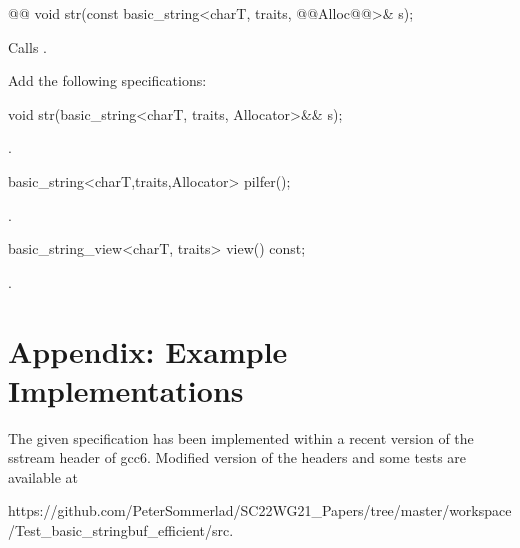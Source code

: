 \documentclass[ebook,11pt,article]{memoir}
\begin{document}
\begin{itemdecl}
    @@
    void str(const basic_string<charT, traits, @@Alloc@@>& s);
\end{itemdecl}

\begin{itemdescr}
\pnum
\effects
Calls
.
\end{itemdescr}


Add the following specifications:

\begin{addedblock}
\begin{itemdecl}
void str(basic_string<charT, traits, Allocator>&& s);
\end{itemdecl}
\begin{itemdescr}
\pnum
\effects {}.
\end{itemdescr}
\begin{itemdecl}
basic_string<charT,traits,Allocator> pilfer();
\end{itemdecl}
\begin{itemdescr}
\pnum
\returns {}.
\end{itemdescr}
\begin{itemdecl}
basic_string_view<charT, traits> view() const;
\end{itemdecl}
\begin{itemdescr}
\pnum
\returns {}.
\end{itemdescr}
\end{addedblock}



\chapter{Appendix: Example Implementations}

The given specification has been implemented within a recent version of the sstream header of gcc6. Modified version of the headers and some tests are available at

{https://github.com/PeterSommerlad/SC22WG21_Papers/tree/master/workspace/Test_basic_stringbuf_efficient/src}.
\end{document}

